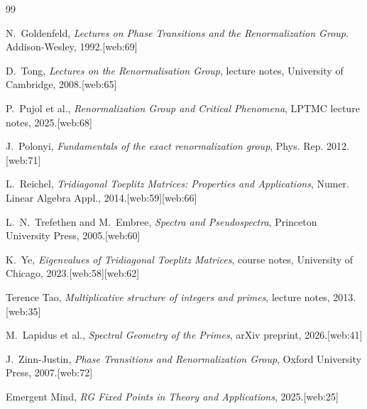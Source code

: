 \documentclass[11pt]{article}
\begin{document}
\begin{thebibliography}{99}

N.~Goldenfeld, \emph{Lectures on Phase Transitions and the Renormalization Group}. Addison-Wesley, 1992.[web:69]

D.~Tong, \emph{Lectures on the Renormalisation Group}, lecture notes, University of Cambridge, 2008.[web:65]

P.~Pujol et al., \emph{Renormalization Group and Critical Phenomena}, LPTMC lecture notes, 2025.[web:68]

J.~Polonyi, \emph{Fundamentals of the exact renormalization group}, Phys. Rep. 2012.[web:71]

L.~Reichel, \emph{Tridiagonal Toeplitz Matrices: Properties and Applications}, Numer. Linear Algebra Appl., 2014.[web:59][web:66]

L.~N.~Trefethen and M.~Embree, \emph{Spectra and Pseudospectra}, Princeton University Press, 2005.[web:60]

K.~Ye, \emph{Eigenvalues of Tridiagonal Toeplitz Matrices}, course notes, University of Chicago, 2023.[web:58][web:62]

Terence Tao, \emph{Multiplicative structure of integers and primes}, lecture notes, 2013.[web:35]

M.~Lapidus et al., \emph{Spectral Geometry of the Primes}, arXiv preprint, 2026.[web:41]

J.~Zinn-Justin, \emph{Phase Transitions and Renormalization Group}, Oxford University Press, 2007.[web:72]

Emergent Mind, \emph{RG Fixed Points in Theory and Applications}, 2025.[web:25]

\end{thebibliography}



\nocite{*}


\clearpage
\end{document}
